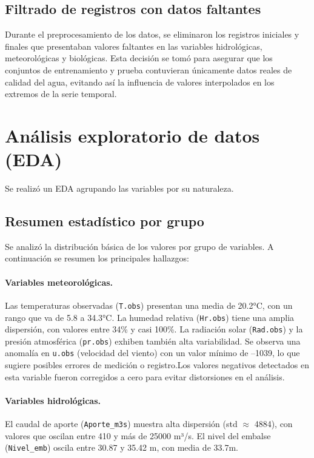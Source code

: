 \documentclass[11pt]{report}
\begin{document}
\subsection{Filtrado de registros con datos faltantes}

Durante el preprocesamiento de los datos, se eliminaron los registros iniciales y finales que presentaban valores faltantes en las variables hidrológicas, meteorológicas y biológicas. Esta decisión se tomó para asegurar que los conjuntos de entrenamiento y prueba contuvieran únicamente datos reales de calidad del agua, evitando así la influencia de valores interpolados en los extremos de la serie temporal.



\section{Análisis exploratorio de datos (EDA)}

Se realizó un EDA agrupando las variables por su naturaleza.

\subsection{Resumen estadístico por grupo}

Se analizó la distribución básica de los valores por grupo de variables. A continuación se resumen los principales hallazgos:

\paragraph{Variables meteorológicas.}
Las temperaturas observadas (\texttt{T.obs}) presentan una media de 20.2°C, con un rango que va de 5.8 a 34.3°C. La humedad relativa (\texttt{Hr.obs}) tiene una amplia dispersión, con valores entre 34\% y casi 100\%. La radiación solar (\texttt{Rad.obs}) y la presión atmosférica (\texttt{pr.obs}) exhiben también alta variabilidad. Se observa una anomalía en \texttt{u.obs} (velocidad del viento) con un valor mínimo de –1039, lo que sugiere posibles errores de medición o registro.Los valores negativos detectados en esta variable fueron corregidos a cero para evitar distorsiones en el análisis.

\paragraph{Variables hidrológicas.}
El caudal de aporte (\texttt{Aporte\_m3s}) muestra alta dispersión (std $\approx$ 4884), con valores que oscilan entre 410 y más de 25000 m³/s. El nivel del embalse (\texttt{Nivel\_emb}) oscila entre 30.87 y 35.42 m, con media de 33.7m.
\end{document}
